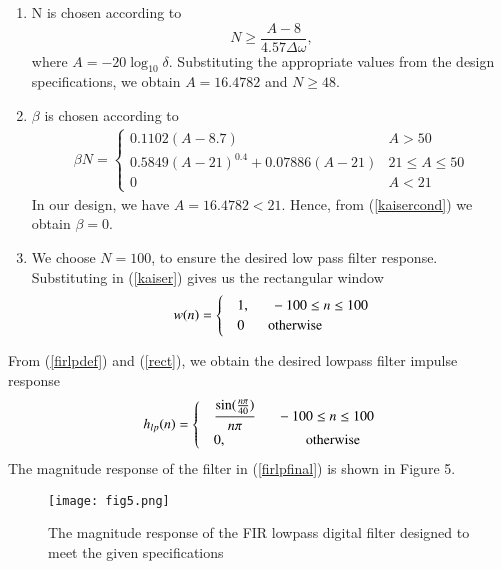 \documentclass[article]{IEEEtran}
\theoremstyle{remark}
\numberwithin{equation}{subsection}
\begin{document}
\begin{enumerate}
\item  N is chosen according to
\begin{equation}
N \geq \frac{A-8}{4.57\Delta \omega},
\end{equation}
where $A = -20\log_{10}\delta$.  Substituting the appropriate values from the design specifications, we obtain
$A = 16.4782$ and $N \geq 48$.

\item  $\beta$ is chosen according to
\begin{eqnarray}
\label{kaisercond}
\beta N = \left\{ \begin{array}{ll} 0.1102(A-8.7) & A > 50 \\
0.5849(A-21)^{0.4}+ 0.07886(A-21) & 21 \leq A \leq 50 \\
0 & A < 21\end{array} \right.
\end{eqnarray}
In our design, we have $A = 16.4782 < 21$.  Hence, from (\ref{kaisercond}) we obtain $\beta = 0$.  

\item We choose $N = 100$, to ensure the desired low pass filter response.  Substituting in (\ref{kaiser})
gives us the rectangular window
\begin{align}
w(n) =
\begin{cases}
& 1, \indent -100 \leq n \leq 100 \\
& 0 \hspace{6mm} \mbox{otherwise}
\end{cases}\label{rect}
\end{align}
\end{enumerate}

From (\ref{firlpdef}) and (\ref{rect}), we obtain the desired lowpass filter impulse response
\begin{align}
h_{lp}(n) =
\begin{cases}
\label{firlpfinal}
& \dfrac{\sin(\frac{n\pi}{40})}{n\pi} \indent -100 \leq n \leq 100  \\
& 0, \hspace{2cm} \mbox{otherwise}
\end{cases}
\end{align}
The magnitude  response of the filter in (\ref{firlpfinal}) is shown in Figure 5.

\begin{figure}[H]
\label{fig5}
\texttt{[image: fig5.png]}
\caption{The magnitude response of the FIR lowpass digital filter designed to meet the given specifications} 
\end{figure}
\end{document}
